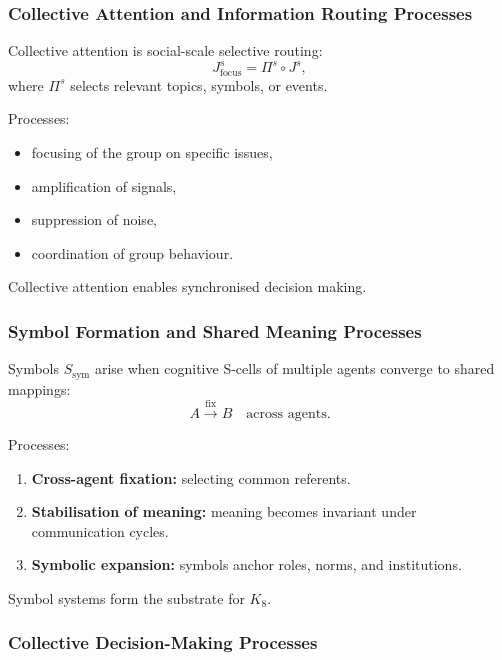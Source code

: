 \subsubsection{Collective Attention and Information Routing Processes}

Collective attention is social-scale selective routing:
\[
J^s_{\text{focus}} = \Pi^s \circ J^s,
\]
where $\Pi^s$ selects relevant topics, symbols, or events.

Processes:
\begin{itemize}
    \item focusing of the group on specific issues,
    \item amplification of signals,
    \item suppression of noise,
    \item coordination of group behaviour.
\end{itemize}

Collective attention enables synchronised decision making.

\subsubsection{Symbol Formation and Shared Meaning Processes}

Symbols $S_{\text{sym}}$ arise when cognitive S-cells of multiple 
agents converge to shared mappings:
\[
A \xrightarrow{\text{fix}} B
\quad \text{across agents}.
\]

Processes:
\begin{enumerate}
    \item \textbf{Cross-agent fixation:}  
    selecting common referents.
    \item \textbf{Stabilisation of meaning:}  
    meaning becomes invariant under communication cycles.
    \item \textbf{Symbolic expansion:}  
    symbols anchor roles, norms, and institutions.
\end{enumerate}

Symbol systems form the substrate for $K_8$.

\subsubsection{Collective Decision-Making Processes}

